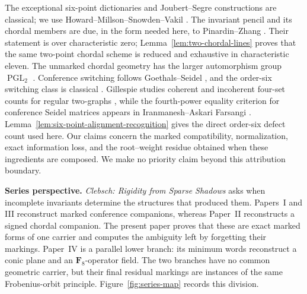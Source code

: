 \documentclass[11pt]{article}
\theoremstyle{definition}
\theoremstyle{remark}
\newcommand{\F}{\mathbf F}
\newcommand{\PGL}{\operatorname{PGL}}
\begin{document}
The exceptional six-point dictionaries and Joubert--Segre constructions are
classical; we use Howard--Millson--Snowden--Vakil
\cite[\S\S1.1--1.6 and 2.1--2.4]{HMSVOuter}.  The invariant pencil and its
chordal members are due, in the form needed here, to Pinardin--Zhang
\cite[\S6.2]{PinardinZhang2025}.  Their statement is over characteristic
zero; Lemma~\ref{lem:two-chordal-lines} proves that the same two-point
chordal scheme is reduced and exhaustive in characteristic eleven.  The
unmarked chordal geometry has the larger
automorphism group \(\PGL_2\) \cite[\S5]{CheltsovEtAl2025Chordal}.
Conference switching follows Goethals--Seidel
\cite[\S\S1--3]{GoethalsSeidel1967}, and the order-six switching class is
classical \cite{BMS1979}.  Gillespie studies coherent and incoherent four-set
counts for regular two-graphs \cite[\S4.1]{GillespieTwoGraph}, while the
fourth-power equality criterion for conference Seidel matrices appears in
Iranmanesh--Askari Farsangi \cite[Theorem~2.4]{IranmaneshFarsangi2015}.
Lemma~\ref{lem:six-point-alignment-recognition} gives the direct order-six
defect count used here.  Our claims concern the marked compatibility,
normalization, exact information loss, and the root--weight residue obtained
when these ingredients are composed.  We make no priority claim beyond this
attribution boundary.

\medskip
\noindent\textbf{Series perspective.}
\emph{Clebsch: Rigidity from Sparse Shadows} asks when incomplete invariants
determine the structures that produced them.  Papers~I and III reconstruct
marked conference companions, whereas Paper~II reconstructs a signed chordal
companion.  The present paper proves that these are exact marked forms of one
carrier and computes the ambiguity left by forgetting their markings.
Paper~IV is a parallel lower branch: its minimum words reconstruct a conic
plane and an \(\F_8\)-operator field.  The two branches have no common geometric
carrier, but their final residual markings are instances of the same
Frobenius-orbit principle.  Figure~\ref{fig:series-map} records this division.
\end{document}
